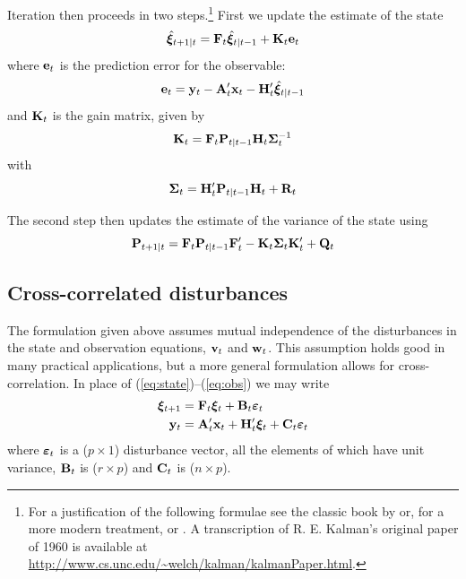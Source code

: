 Iteration then proceeds in two steps.\footnote{For a justification of
  the following formulae see the classic book by
  \cite{anderson-moore79} or, for a more modern treatment,
  \cite{pollock99} or \cite{hamilton94}.  A transcription of
  R. E. Kalman's original paper of 1960 is available at
  \url{http://www.cs.unc.edu/~welch/kalman/kalmanPaper.html}.}  First
we update the estimate of the state
%
\begin{equation}
\hat{\bm{\xi}}_{t+1|t} = \mathbf{F}_t\hat{\bm{\xi}}_{t|t-1} + 
  \mathbf{K}_t \mathbf{e}_t
\end{equation}
%
where $\mathbf{e}_t$ is the prediction error for the observable:
\[
\mathbf{e}_t = \mathbf{y}_t - \mathbf{A}_t'\mathbf{x}_t - \mathbf{H}_t' \hat{\bm{\xi}}_{t|t-1}
\]
%
and $\mathbf{K}_t$ is the gain matrix, given by
%
\begin{equation}
\label{eq:gain}
\mathbf{K}_t = \mathbf{F}_t\mathbf{P}_{t|t-1}\mathbf{H}_t \bm{\Sigma}_t^{-1}
\end{equation}
%
with
%
\[
\bm{\Sigma}_t = \mathbf{H}_t'\mathbf{P}_{t|t-1}\mathbf{H}_t + \mathbf{R}_t
\]

The second step then updates the estimate of the variance of the state
using
%
\begin{equation}
\mathbf{P}_{t+1|t} = \mathbf{F}_t\mathbf{P}_{t|t-1}\mathbf{F}_t' -
 \mathbf{K}_t \bm{\Sigma}_t \mathbf{K}_t' + \mathbf{Q}_t
\end{equation}

\subsection{Cross-correlated disturbances}

The formulation given above assumes mutual independence of the
disturbances in the state and observation equations, $\mathbf{v}_t$ and
$\mathbf{w}_t$.  This assumption holds good in many practical
applications, but a more general formulation allows for
cross-correlation.  In place of (\ref{eq:state})--(\ref{eq:obs}) we
may write
%
\begin{align*}
  \bm{\xi}_{t+1} &= \mathbf{F}_t \bm{\xi}_t + 
     \mathbf{B}_t \bm{\varepsilon}_t \\
  \mathbf{y}_t &= \mathbf{A}_t'\mathbf{x}_t + \mathbf{H}_t' \bm{\xi}_t + 
     \mathbf{C}_t \bm{\varepsilon}_t 
\end{align*}
%
where $\bm{\varepsilon}_t$ is a ($p \times 1$) disturbance vector, all the
elements of which have unit variance, $\mathbf{B}_t$ is ($r \times p$)
and $\mathbf{C}_t$ is ($n \times p$).

